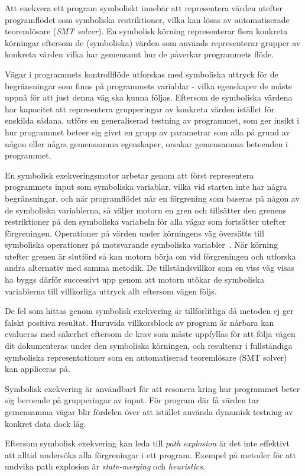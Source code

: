 Att exekvera ett program symboliskt innebär att representera värden utefter 
programflödet som symboliska restriktioner, vilka kan lösas av automatiserade 
teoremlösare (\emph{SMT solver}). En symbolisk körning representerar flera konkreta 
körningar eftersom de (symboliska) värden som används representerar grupper av 
konkreta värden vilka har gemensamt hur de påverkar programmets flöde. 

Vägar i programmets kontrollflöde utforskas med symboliska uttryck för de 
begränsningar som finns på programmets variablar - vilka egenskaper de måste uppnå 
för att just denna väg ska kunna följas. Eftersom de symboliska värdena har kapacitet 
att representera grupperingar av konkreta värden istället för enskilda sådana, 
utförs en generaliserad testning av programmet, som ger insikt i hur programmet 
beteer sig givet en grupp av parametrar som alla på grund av någon eller några 
gemensamma egenskaper, orsakar gemensamma beteenden i programmet. 

En symbolisk exekveringsmotor arbetar genom att först representera programmets input 
som symboliska variablar, vilka vid starten inte har några begränsningar, och när 
programflödet når en förgrening som baseras på någon av de symboliska variablerna, 
så väljer motorn en gren och tillsätter den grenens restriktioner på den symboliska 
variabeln för alla vägar som fortsätter utefter förgreningen. Operationer på värden 
under körningens väg översätts till symboliska operationer på motsvarande symboliska 
variabler~\cite{klee}. När körning utefter grenen är slutförd så kan motorn börja om 
vid förgreningen och utforska andra alternativ med samma metodik. De tillståndsvillkor 
som en viss väg visas ha byggs därför successivt upp genom att motorn utökar de 
symboliska variablerna till villkorliga uttryck allt eftersom vägen följs. 

De fel som hittas genom symbolisk exekvering är tillförlitliga då metoden ej ger falskt 
positiva resultat. Huruvida villkorsblock av program är nårbara kan evalueras med 
säkerhet eftersom de krav som måste uppfyllas för att följa vägen dit dokumenteras under 
den symboliska körningen, och resulterar i fullständiga symboliska representationer 
som en automatiserad teoremlösare (SMT solver) kan appliceras på. 

Symbolisk exekvering är användbart för att resonera kring hur programmet beter sig 
beroende på grupperingar av input. För program där få värden tar gemensamma vägar blir 
fördelen över att istället använda dynamisk testning av konkret data dock låg. 

Eftersom symbolisk exekvering kan leda till \emph{path explosion} är det inte effektivt 
att alltid undersöka alla förgreningar i ett program. Exempel på metoder för att undvika 
path explosion är \emph{state-merging} och \emph{heuristics}. 
